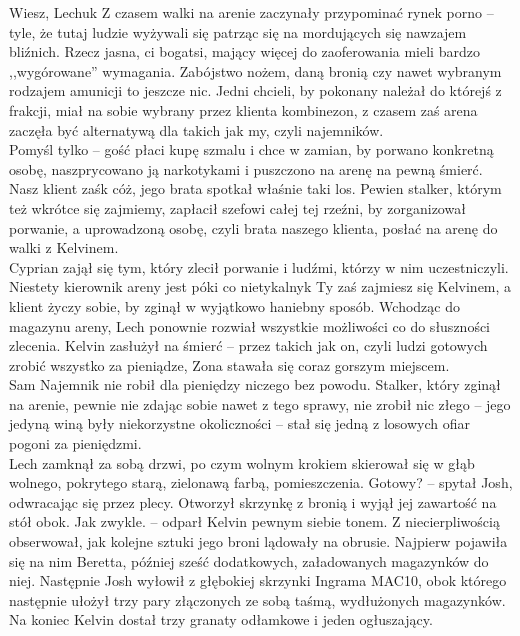 \documentclass[../MAIN.tex]{subfiles}
\begin{document}
\sx Wiesz, Lechu\3k Z czasem walki na arenie zaczynały przypominać rynek porno -- tyle, że tutaj ludzie wyżywali się patrząc się na mordujących się nawzajem bliźnich. Rzecz jasna, ci bogatsi, mający więcej do zaoferowania mieli bardzo ,,wygórowane'' wymagania. Zabójstwo nożem, daną bronią czy nawet wybranym rodzajem amunicji to jeszcze nic. Jedni chcieli, by pokonany należał do którejś z frakcji, miał na sobie wybrany przez klienta kombinezon, z czasem zaś arena zaczęła być alternatywą dla takich jak my, czyli najemników.\\
Pomyśl tylko -- gość płaci kupę szmalu i chce w zamian, by porwano konkretną osobę, naszprycowano ją narkotykami i puszczono na arenę na pewną śmierć. Nasz klient zaś\3k cóż, jego brata spotkał właśnie taki los. Pewien stalker, którym też wkrótce się zajmiemy, zapłacił szefowi całej tej rzeźni, by zorganizował porwanie, a uprowadzoną osobę, czyli brata naszego klienta, posłać na arenę do walki z Kelvinem.\\
Cyprian zajął się tym, który zlecił porwanie i ludźmi, którzy w nim uczestniczyli. Niestety kierownik areny jest póki co nietykalny\3k Ty zaś zajmiesz się Kelvinem, a klient życzy sobie, by zginął w wyjątkowo haniebny sposób.
\qd
Wchodząc do magazynu areny, Lech ponownie rozwiał wszystkie możliwości co do słuszności zlecenia. Kelvin zasłużył na śmierć -- przez takich jak on, czyli ludzi gotowych zrobić wszystko za pieniądze, Zona stawała się coraz gorszym miejscem.\\
Sam Najemnik nie robił dla pieniędzy niczego bez powodu. Stalker, który zginął na arenie, pewnie nie zdając sobie nawet z tego sprawy, nie zrobił nic złego -- jego jedyną winą były niekorzystne okoliczności -- stał się jedną z losowych ofiar pogoni za pieniędzmi.\\
Lech zamknął za sobą drzwi, po czym wolnym krokiem skierował się w głąb wolnego, pokrytego starą, zielonawą farbą, pomieszczenia.
\dd\sx Gotowy? -- spytał Josh, odwracając się przez plecy. Otworzył skrzynkę z bronią i wyjął jej zawartość na stół obok.
\xx Jak zwykle. -- odparł Kelvin pewnym siebie tonem. 
\qd
Z niecierpliwością obserwował, jak kolejne sztuki jego broni lądowały na obrusie. Najpierw pojawiła się na nim Beretta, później sześć dodatkowych, załadowanych magazynków do niej. Następnie Josh wyłowił z głębokiej skrzynki Ingrama MAC10, obok którego następnie ułożył trzy pary złączonych ze sobą taśmą, wydłużonych magazynków.\\
Na koniec Kelvin dostał trzy granaty odłamkowe i jeden ogłuszający.\\
\end{document}

